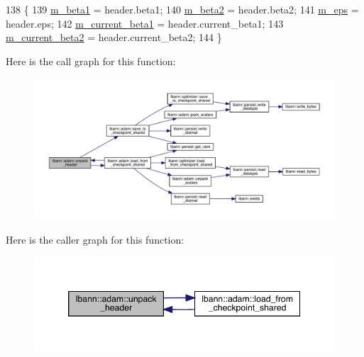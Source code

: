 \begin{DoxyCode}
138                                                     \{
139     \hyperlink{classlbann_1_1adam_a73af15a28066edbfad9ba6a900746a19}{m\_beta1} = header.beta1;
140     \hyperlink{classlbann_1_1adam_ab1f2a16b8eb7e265895ea9eef3fe87b2}{m\_beta2} = header.beta2;
141     \hyperlink{classlbann_1_1adam_a751102f0fd866612f5685050a08020a9}{m\_eps} = header.eps;
142     \hyperlink{classlbann_1_1adam_a53c3034e187da2720447bbb4f2b59a5d}{m\_current\_beta1} = header.current\_beta1;
143     \hyperlink{classlbann_1_1adam_ad38376b684d69d4a15da1d11f8808ca7}{m\_current\_beta2} = header.current\_beta2;
144   \}
\end{DoxyCode}
Here is the call graph for this function\+:\nopagebreak
\begin{figure}[H]
\begin{center}
\leavevmode
\includegraphics[width=350pt]{classlbann_1_1adam_ae5b6108946e6a09b4e13e4285350aa05_cgraph}
\end{center}
\end{figure}
Here is the caller graph for this function\+:\nopagebreak
\begin{figure}[H]
\begin{center}
\leavevmode
\includegraphics[width=346pt]{classlbann_1_1adam_ae5b6108946e6a09b4e13e4285350aa05_icgraph}
\end{center}
\end{figure}
\mbox{\label{classlbann_1_1adam_a21a3d2bce0bac5e6c022c5d95ec6348b}} 
